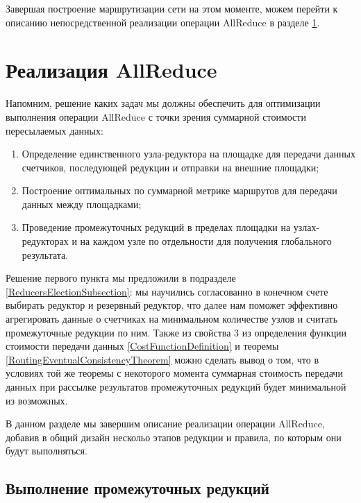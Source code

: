 Завершая построение маршрутизации сети на этом моменте, можем перейти к описанию непосредственной реализации операции AllReduce в разделе \ref{AllReduceSection}.

\section{Реализация AllReduce}
\label{AllReduceSection}

Напомним, решение каких задач мы должны обеспечить для оптимизации выполнения операции AllReduce с точки зрения суммарной стоимости пересылаемых данных:

\begin{enumerate}
    \item Определение единственного узла-редуктора на площадке для передачи данных счетчиков, последующей редукции и отправки на внешние площадки;
    
    \item Построение оптимальных по суммарной метрике маршрутов для передачи данных между площадками;
    
    \item Проведение промежуточных редукций в пределах площадки на узлах-редукторах и на каждом узле по отдельности для получения глобального результата.
\end{enumerate}

Решение первого пункта мы предложили в подразделе \ref{ReducersElectionSubsection}: мы научились согласованно в конечном счете выбирать редуктор и резервный редуктор, что далее нам поможет эффективно агрегировать данные о счетчиках на минимальном количестве узлов и считать промежуточные редукции по ним. Также из свойства 3 из определения функции стоимости передачи данных \ref{CostFunctionDefinition} и теоремы \ref{RoutingEventualConsistencyTheorem} можно сделать вывод о том, что в условиях той же теоремы с некоторого момента суммарная стоимость передачи данных при рассылке результатов промежуточных редукций будет минимальной из возможных.

В данном разделе мы завершим описание реализации операции AllReduce, добавив в общий дизайн нескольо этапов редукции и правила, по которым они будут выполняться.

\subsection{Выполнение промежуточных редукций}
\label{ReductionImplementationSubsection}

